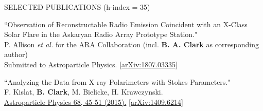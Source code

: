 \documentclass{resume} %
\begin{document}
\begin{rSection}{SELECTED PUBLICATIONS (h-index = 35)}
\begin{etaremune}
 \item ``Observation of Reconstructable Radio Emission Coincident with an X-Class Solar Flare in the Askaryan Radio Array Prototype Station." \\
P. Allison {\it et al.} for the ARA Collaboration (incl. \textbf{B. A. Clark} as corresponding author) \\
 Submitted to Astroparticle Physics. \href{https://arxiv.org/abs/1807.03335}{[arXiv:1807.03335]}
 


   \item ``Analyzing the Data from X-ray Polarimeters with Stokes Parameters." \\
 F. Kislat,  \textbf{B. Clark}, M. Bielicke, H. Krawczynski.  \\
  \href{http://dx.doi.org/10.1016/j.astropartphys.2015.02.007}{Astroparticle Physics 68, 45-51 (2015).} \href{https://arxiv.org/abs/1409.6214}{[arXiv:1409.6214]} 
  


 \end{etaremune}
 
\end{rSection}

\newpage

\end{document}
